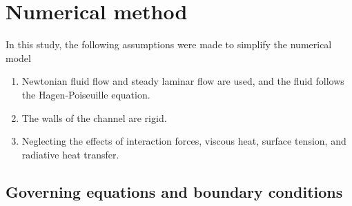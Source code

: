 %
% 
%

\section{Numerical method}

In this study, the following assumptions were made to simplify the numerical model

\begin{enumerate}[1.] %
    \item Newtonian fluid flow and steady laminar flow are used, and the fluid follows the Hagen-Poiseuille equation.
    \item The walls of the channel are rigid.
    \item Neglecting the effects of interaction forces, viscous heat, surface tension, and radiative heat transfer.
\end{enumerate}

\subsection{Governing equations and boundary conditions}

